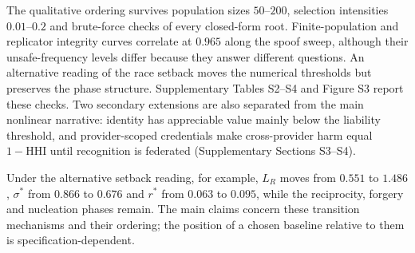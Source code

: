 The qualitative ordering survives population sizes $50$--$200$, selection
intensities $0.01$--$0.2$ and brute-force checks of every closed-form root.
Finite-population and replicator integrity curves correlate at $0.965$ along
the spoof sweep, although their unsafe-frequency levels differ because they
answer different questions. An alternative reading of the race setback moves
the numerical thresholds but preserves the phase structure. Supplementary
Tables S2--S4 and Figure S3 report these checks. Two secondary extensions are
also separated from the main nonlinear narrative: identity has appreciable
value mainly below the liability threshold, and provider-scoped credentials
make cross-provider harm equal $1-\mathrm{HHI}$ until recognition is federated
(Supplementary Sections S3--S4).

Under the alternative setback reading, for example, $L_R$ moves from $0.551$
to $1.486$, $\sigma^{*}$ from $0.866$ to $0.676$ and $r^{*}$ from $0.063$ to
$0.095$, while the reciprocity, forgery and nucleation phases remain. The main
claims concern these transition mechanisms and their ordering; the position
of a chosen baseline relative to them is specification-dependent.

